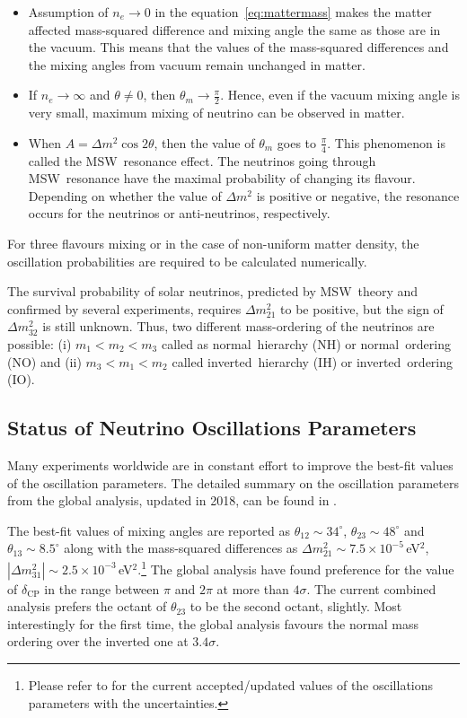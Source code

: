 \begin{itemize}\itemsep -4pt
\item Assumption of $n_{e}\rightarrow 0$ in the equation~\ref{eq:mattermass}
  makes the matter affected mass-squared difference and mixing angle the same
  as those are in the vacuum. This means that the values of the mass-squared
  differences and the mixing angles from vacuum remain unchanged in matter.
\item If $n_{e}\rightarrow\infty$ and $\theta\neq 0$, then
  $\theta_{m}\rightarrow\frac{\pi}{2}$. Hence, even if the vacuum mixing angle
  is very small, maximum mixing of neutrino can be observed in matter.
\item When $A = \Delta m^{2}\cos 2\theta$, then the value of $\theta_{m}$ goes
  to $\frac{\pi}{4}$. This phenomenon is called the MSW~resonance effect.
  The neutrinos going through MSW~resonance have the maximal probability of
  changing its flavour. Depending on whether the value of $\Delta m^{2}$ is
  positive or negative, the resonance occurs for the neutrinos or
  anti-neutrinos, respectively.
\end{itemize}
For three flavours mixing or in the case of non-uniform matter density, the oscillation probabilities are required to be calculated numerically.

The survival probability of solar neutrinos, predicted by MSW~theory and confirmed by several experiments\cite{homestake,gallex,sage,superk,sno,kamland}, requires $\Delta m_{21}^{2}$ to be positive, but the sign of $\Delta m_{32}^{2}$ is still unknown. Thus, two different mass-ordering of the neutrinos are possible: (i) $m_{1}<m_{2}<m_{3}$ called as normal~hierarchy (NH) or normal~ordering (NO) and (ii) $m_{3}<m_{1}<m_{2}$ called inverted~hierarchy (IH) or inverted~ordering (IO).


\subsection{Status of Neutrino Oscillations Parameters}
Many experiments worldwide are in constant effort to improve the
best-fit values of the oscillation parameters. The detailed summary
on the oscillation parameters from the global analysis, updated in
2018, can be found in \cite{neutrinostatus}.

The best-fit values of mixing angles are reported as
$\theta_{12}\sim 34^{\circ}$, $\theta_{23}\sim 48^{\circ}$ and
$\theta_{13}\sim 8.5^{\circ}$ along with the mass-squared differences as
$\Delta m^2_{21}\sim 7.5\times 10^{-5}$\,eV$^{2}$,
$\left|\Delta m^2_{31}\right|\sim 2.5\times 10^{-3}$\,eV$^{2}$.\footnote{Please refer to \cite{neutrinostatus} for the current accepted/updated values of the oscillations parameters with the uncertainties.}
The global analysis have found preference for the value of
$\delta_{\mathrm{CP}}$ in the range between $\pi$ and $2\pi$ at more than
$4\sigma$\cite{neutrinostatus}. The current combined analysis prefers
the octant of $\theta_{23}$ to be the second octant, slightly. Most
interestingly for the first time, the global analysis favours the
normal mass ordering over the inverted one at
$3.4\sigma$\cite{neutrinostatus}.

